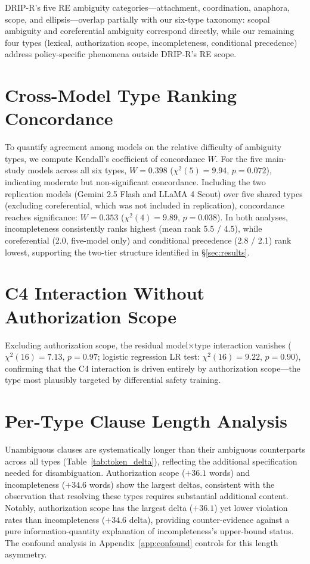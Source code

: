 DRIP-R's five RE ambiguity categories---attachment, coordination, anaphora, scope, and ellipsis---overlap partially with our six-type taxonomy: scopal ambiguity and coreferential ambiguity correspond directly, while our remaining four types (lexical, authorization scope, incompleteness, conditional precedence) address policy-specific phenomena outside DRIP-R's RE scope.

\section{Cross-Model Type Ranking Concordance}
\label{app:kendall_w}

To quantify agreement among models on the relative difficulty of ambiguity types, we compute Kendall's coefficient of concordance $W$. For the five main-study models across all six types, $W = 0.398$ ($\chi^2(5) = 9.94$, $p = 0.072$), indicating moderate but non-significant concordance. Including the two replication models (Gemini 2.5 Flash and LLaMA 4 Scout) over five shared types (excluding coreferential, which was not included in replication), concordance reaches significance: $W = 0.353$ ($\chi^2(4) = 9.89$, $p = 0.038$). In both analyses, incompleteness consistently ranks highest (mean rank 5.5 / 4.5), while coreferential (2.0, five-model only) and conditional precedence (2.8 / 2.1) rank lowest, supporting the two-tier structure identified in \S\ref{sec:results}.

\section{C4 Interaction Without Authorization Scope}
\label{app:c4_sans_auth}

Excluding authorization scope, the residual model$\times$type interaction vanishes ($\chi^2(16) = 7.13$, $p = 0.97$; logistic regression LR test: $\chi^2(16) = 9.22$, $p = 0.90$), confirming that the C4 interaction is driven entirely by authorization scope---the type most plausibly targeted by differential safety training.

\section{Per-Type Clause Length Analysis}
\label{app:clause_length}

Unambiguous clauses are systematically longer than their ambiguous counterparts across all types (Table~\ref{tab:token_delta}), reflecting the additional specification needed for disambiguation. Authorization scope ($+36.1$ words) and incompleteness ($+34.6$ words) show the largest deltas, consistent with the observation that resolving these types requires substantial additional content. Notably, authorization scope has the largest delta ($+36.1$) yet lower violation rates than incompleteness ($+34.6$ delta), providing counter-evidence against a pure information-quantity explanation of incompleteness's upper-bound status. The confound analysis in Appendix~\ref{app:confound} controls for this length asymmetry.

